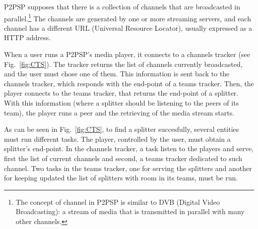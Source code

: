 \label{sec:CTS}
\begin{figure*}
   \caption{Tasks involved in the process of
    determing the corresponding team tracker of a given
    channel.\label{fig:CTS}}
\end{figure*}
P2PSP supposes that there is a collection of channels that are
broadcasted in parallel.\footnote{The concept of channel in P2PSP is
  similar to DVB (Digital Video Broadcasting): a stream of media that
  is transmitted in parallel with many other channels.} The channels
are generated by one or more streaming servers, and each channel has a
different URL (Universal Resource Locator), usually expressed as a
HTTP address.

When a user runs a P2PSP's media player, it connects to a channels
tracker (see Fig.~\ref{fig:CTS}). The tracker returns the list of
channels currently broadcasted, and the user must chose one of
them. This information is sent back to the channels tracker, which
responds with the end-point of a teams tracker. Then, the player
connects to the teams tracker, that returns the end-point of a
splitter. With this information (where a splitter should be listening
to the peers of its team), the player runs a peer and the retrieving
of the media stream starts.

As can be seen in Fig.~\ref{fig:CTS}, to find a splitter succesfully,
several entities must run different tasks. The player, controlled by
the user, must obtain a splitter's end-point. In the channels tracker,
a task listen to the players and serve, first the list of current
channels and second, a teams tracker dedicated to such channel. Two
tasks in the teams tracker, one for serving the splitters and another
for keeping updated the list of splitters with room in its teams, must
be run.
